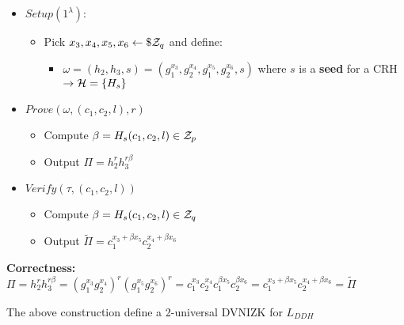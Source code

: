 \begin{itemize}
    \item $Setup(1^\lambda)$: \begin{itemize}
        \item Pick $x_3,x_4,x_5,x_6 \leftarrow\$ \mathcal{Z}_q$ and define:
        \begin{itemize}
            \item $\omega=(h_2,h_3,s)=(g_1^{x_3},g_2^{x_4},g_1^{x_5},g_2^{x_6},s)$ where $s$ is a \textbf{seed} for a CRH$\rightarrow \mathcal{H}=\{H_s\}$ %
        \end{itemize}
    \end{itemize}
    \item $Prove(\omega, (c_1,c_2,l), r)$ \begin{itemize}
        \item Compute $\beta=H_s(c_1,c_2,l)\in \mathcal{Z}_p$
        \item Output $\Pi=h_2^rh_3^{r\beta}$
    \end{itemize}
    \item $Verify(\tau, (c_1,c_2,l))$\begin{itemize}
        \item Compute $\beta=H_s(c_1,c_2,l)\in \mathcal{Z}_q$
        \item Output $\widetilde{\Pi}=c_1^{x_3+\beta x_5}c_2^{x_4+\beta x_6}$
    \end{itemize}
\end{itemize}

\noindent\textbf{Correctness:}\\ $\Pi=h_2^rh_3^{r\beta}=(g_1^{x_3}g_2^{x_4})^r(g_1^{x_5}g_2^{x_6})^r=c_1^{x_3}c_2^{x_4}c_1^{\beta x_5}c_2^{\beta x_6}=c_1^{x_3+\beta x_5}c_2^{x_4+\beta x_6}=\widetilde{\Pi}$

\begin{theorem}
    The above construction define a 2-universal DVNIZK for $L_{DDH}$    
\end{theorem}

